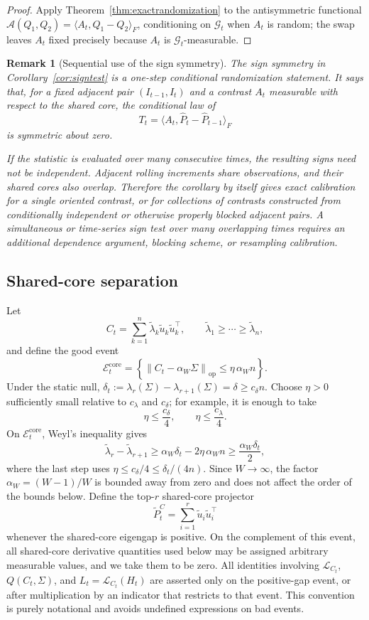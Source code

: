 \documentclass[11pt]{article}
\theoremstyle{tightplain}
\theoremstyle{tightdef}
\newtheorem{remark}[theorem]{Remark}
\DeclareMathOperator{\op}{op}
\newcommand{\norm}[1]{\left\lVert #1 \right\rVert}
\begin{document}
\begin{proof}
Apply Theorem~\ref{thm:exactrandomization} to the antisymmetric functional
$\mathcal A(Q_1,Q_2)=\langle A_t,Q_1-Q_2\rangle_F$, conditioning on
$\mathcal G_t$ when $A_t$ is random; the swap leaves $A_t$ fixed precisely
because $A_t$ is $\mathcal G_t$-measurable.
\end{proof}

\begin{remark}[Sequential use of the sign symmetry]\label{rem:sequentialsign}
The sign symmetry in Corollary~\ref{cor:signtest} is a one-step conditional
randomization statement. It says that, for a fixed adjacent pair
$(I_{t-1},I_t)$ and a contrast $A_t$ measurable with respect to the shared core,
the conditional law of
\[
T_t=\langle A_t,\widehat P_t-\widehat P_{t-1}\rangle_F
\]
is symmetric about zero.

If the statistic is evaluated over many consecutive times, the resulting signs
need not be independent. Adjacent rolling increments share observations, and
their shared cores also overlap. Therefore the corollary by itself gives exact
calibration for a single oriented contrast, or for collections of contrasts
constructed from conditionally independent or otherwise properly blocked
adjacent pairs. A simultaneous or time-series sign test over many overlapping
times requires an additional dependence argument, blocking scheme, or
resampling calibration.
\end{remark}

\subsection{Shared-core separation}

Let
\[
C_t=\sum_{k=1}^n\widetilde\lambda_k\widetilde u_k\widetilde u_k^\top,
\qquad
\widetilde\lambda_1\ge\cdots\ge\widetilde\lambda_n,
\]
and define the good event
\[
\mathcal E_t^{\mathrm{core}}
=\left\{\norm{C_t-\alpha_W\Sigma}_{\op}\le \eta\,\alpha_W n\right\}.
\]
Under the static null, $\delta_t:=\lambda_r(\Sigma)-\lambda_{r+1}(\Sigma)=\delta\ge c_\delta n$.
Choose $\eta>0$ sufficiently small relative to $c_\lambda$ and $c_\delta$; for
example, it is enough to take
\[
\eta\le\frac{c_\delta}{4},
\qquad
\eta\le\frac{c_\lambda}{4}.
\]
On $\mathcal E_t^{\mathrm{core}}$, Weyl's inequality \cite[Ch.~III]{Bhatia1997}
gives
\[
\widetilde\lambda_r-\widetilde\lambda_{r+1}
\ge
\alpha_W\delta_t-2\eta\,\alpha_W n
\ge
\frac{\alpha_W\delta_t}{2},
\]
where the last step uses $\eta\le c_\delta/4\le \delta_t/(4n)$. Since
$W\to\infty$, the factor $\alpha_W=(W-1)/W$ is bounded away from zero and does
not affect the order of the bounds below. Define the top-$r$ shared-core
projector
\[
\widetilde P_t^C
=\sum_{i=1}^r \widetilde u_i\widetilde u_i^\top
\]
whenever the shared-core eigengap is positive. On the complement of this event,
all shared-core derivative quantities used below may be assigned arbitrary
measurable values, and we take them to be zero. All identities involving
$\mathcal L_{C_t}$, $Q(C_t,\Sigma)$, and $L_t=\mathcal L_{C_t}(H_t)$ are asserted
only on the positive-gap event, or after multiplication by an indicator that
restricts to that event. This convention is purely notational and avoids
undefined expressions on bad events.
\end{document}
